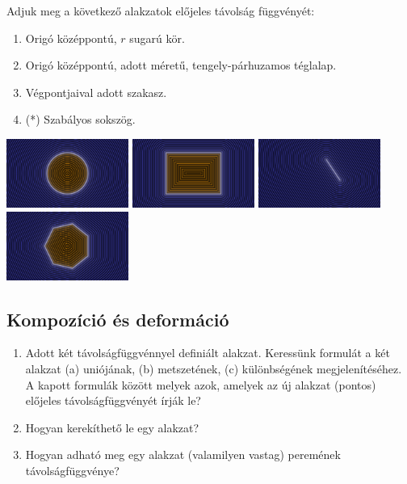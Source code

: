 \matfeladatok


Adjuk meg a következő alakzatok előjeles távolság függvényét:

\begin{enumerate}[resume]
  \item Origó középpontú, $r$ sugarú kör.
  \item Origó középpontú, adott méretű, tengely-párhuzamos téglalap.
  \item Végpontjaival adott szakasz.
  \item (*) Szabályos sokszög.
\end{enumerate}

\begin{center}
  \hfill
\includegraphics[width=4cm]{images/f22.png}\hfill
\includegraphics[width=4cm]{images/f23.png}\hfill
\includegraphics[width=4cm]{images/f24.png}\hfill
\includegraphics[width=4cm]{images/f25.png}\hfill~
\end{center}

\subsection{Kompozíció és deformáció}

\matfeladatok

\begin{enumerate}[resume]

\item Adott két távolságfüggvénnyel definiált alakzat. Keressünk formulát a
két alakzat
(a) uniójának,
(b) metszetének,
(c) különbségének megjelenítéséhez. A kapott formulák között melyek azok, amelyek
az új alakzat (pontos) előjeles távolságfüggvényét írják le?

\item Hogyan kerekíthető le egy alakzat?

\item Hogyan adható meg egy alakzat (valamilyen vastag) peremének távolságfüggvénye?
\end{enumerate}

